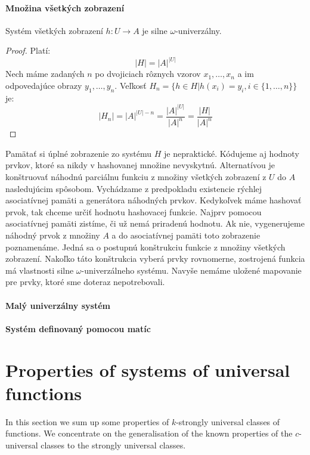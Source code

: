 \paragraph{Množina všetkých zobrazení}
\begin{remark}
Systém všetkých zobrazení $h: U \rightarrow A$ je silne $\omega$-univerzálny.
\end{remark}
\begin{proof}
Platí:
\begin{displaymath}
|H| = {|A|}^{|U|}
\end{displaymath}
Nech máme zadaných $n$ po dvojiciach rôznych vzorov $x_1, \dots, x_n$ a im odpovedajúce obrazy $y_1, \dots, y_n$. Veľkosť $H_n = \lbrace h \in H | h(x_i) = y_i, i \in \lbrace 1, \dots, n \rbrace \rbrace$ je:
\begin{displaymath}
|H_n| = {|A|}^{|U| - n} = \frac{{|A|}^{|U|}}{{|A|}^{n}} = \frac{|H|}{|A|^n}
\end{displaymath}
\end{proof}

Pamätať si úplné zobrazenie zo systému $H$ je nepraktické. Kódujeme aj hodnoty prvkov, ktoré sa nikdy v hashovanej množine nevyskytnú. Alternatívou je konštruovať náhodnú parciálnu funkciu z množiny všetkých zobrazení z $U$ do $A$ nasledujúcim spôsobom. Vychádzame z predpokladu existencie rýchlej asociatívnej pamäti a generátora náhodných prvkov. Kedykoľvek máme hashovať prvok, tak chceme určiť hodnotu hashovacej funkcie. Najprv pomocou asociatívnej pamäti zistíme, či už nemá priradenú hodnotu. Ak nie, vygenerujeme náhodný prvok z množiny $A$ a do asociatívnej pamäti toto zobrazenie poznamenáme. Jedná sa o postupnú konštrukciu funkcie z množiny všetkých zobrazení. Nakoľko táto konštrukcia vyberá prvky rovnomerne, zostrojená funkcia má vlastnosti silne $\omega$-univerzálneho systému. Navyše nemáme uložené mapovanie pre prvky, ktoré sme doteraz nepotrebovali.

\paragraph{Malý univerzálny systém}


\paragraph{Systém definovaný pomocou matíc}

\section{Properties of systems of universal functions}
In this section we sum up some properties of $k$-strongly universal classes of functions. We concentrate on the generalisation of the known properties of the $c$-universal classes to the strongly universal classes.

